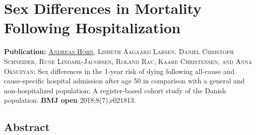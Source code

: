 

\chapter{Sex Differences in Mortality Following Hospitalization}
\label{ch:paper1}


\textbf{Publication:}
\textsc{\underline{Andreas H\"ohn}, Lisbeth Aagaard Larsen, Daniel Christoph Schneider, 
		Rune Lindahl-Jacobsen, Roland Rau, Kaare Christensen, and Anna Oksuzyan:} 
		Sex differences in the 1-year risk of dying following all-cause and cause-specific hospital 
		admission after age 50 in comparison with a general and non-hospitalized population: A 
		register-based cohort study of the Danish population. \textbf{BMJ open} 2018;8(7),e021813. \textit{} 


\newpage

\section{Abstract}

